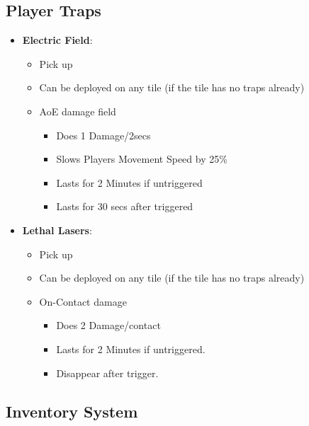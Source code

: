 \documentclass[10pt]{report}
\begin{document}
\subsection{Player Traps}

\begin{itemize}
    \item \textbf{Electric Field}:
    \begin{itemize}
        \item Pick up
        \item Can be deployed on any tile (if the tile has no traps already)
        \item AoE damage field
        \begin{itemize}
            \item Does 1 Damage/2secs
            \item Slows Players Movement Speed by 25\%
            \item Lasts for 2 Minutes if untriggered
            \item Lasts for 30 secs after triggered
        \end{itemize}
    \end{itemize}
    \item \textbf{Lethal Lasers}:
    \begin{itemize}
        \item Pick up
        \item Can be deployed on any tile (if the tile has no traps already)
        \item On-Contact damage
        \begin{itemize}
            \item Does 2 Damage/contact
            \item Lasts for 2 Minutes if untriggered.
            \item Disappear after trigger.
        \end{itemize}
    \end{itemize}
\end{itemize}

\subsection{Inventory System}
\end{document}
